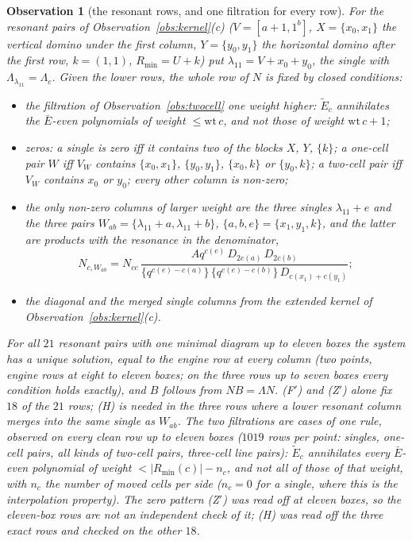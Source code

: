 \documentclass[11pt]{article}
\newtheorem{observation}{Observation}
\newcommand{\Lam}{\Lambda}
\newcommand{\Et}{\widetilde{E}}
\begin{document}
\begin{observation}[the resonant rows, and one filtration for every row]\label{obs:resrows}
For the resonant pairs of Observation~\ref{obs:kernel}(c) ($V=[a+1,1^b]$, $X=\{x_0,x_1\}$ the vertical domino under the
first column, $Y=\{y_0,y_1\}$ the horizontal domino after the first row, $k=(1,1)$, $R_{\min}=U+k$) put
$\lambda_{11}=V+x_0+y_0$, the single with $\Lam_{\lambda_{11}}=\Lam_c$.  Given the lower rows, the whole row of $N$ is fixed
by closed conditions:
\begin{itemize}
\item[(F$'$)] the filtration of Observation~\ref{obs:twocell} one weight higher: $\Et_c$ annihilates the $\bar E$-even
polynomials of weight $\le\mathrm{wt}\,c$, and not those of weight $\mathrm{wt}\,c+1$;
\item[(Z$'$)] zeros: a single is zero iff it contains two of the blocks $X$, $Y$, $\{k\}$; a one-cell pair $W$ iff $V_W$
contains $\{x_0,x_1\}$, $\{y_0,y_1\}$, $\{x_0,k\}$ or $\{y_0,k\}$; a two-cell pair iff $V_W$ contains $x_0$ or $y_0$;
every other column is non-zero;
\item[(H)] the only non-zero columns of larger weight are the three singles $\lambda_{11}+e$ and the three pairs
$W_{ab}=\{\lambda_{11}+a,\lambda_{11}+b\}$, $\{a,b,e\}=\{x_1,y_1,k\}$, and the latter are products with the resonance in
the denominator,
\[
N_{c,W_{ab}}=N_{cc}\,\frac{Aq^{c(e)}\,D_{2c(a)}\,D_{2c(b)}}{\{q^{c(e)-c(a)}\}\,\{q^{c(e)-c(b)}\}\,D_{c(x_1)+c(y_1)}};
\]
\item[(D), (K$'$)] the diagonal and the merged single columns from the extended kernel of Observation~\ref{obs:kernel}(c).
\end{itemize}
For all $21$ resonant pairs with one minimal diagram up to eleven boxes the system has a unique solution, equal to the
engine row at every column (two points, engine rows at eight to eleven boxes; on the three rows up to seven boxes every
condition holds exactly), and $B$ follows from $NB=\Lam N$.  (F$'$) and (Z$'$) alone fix $18$ of the $21$ rows; (H) is
needed in the three rows where a lower resonant column merges into the same single as $W_{ab}$.  The two filtrations are
cases of one rule, observed on every clean row up to eleven boxes ($1019$ rows per point: singles, one-cell pairs, all
kinds of two-cell pairs, three-cell line pairs): \emph{$\Et_c$ annihilates every $\bar E$-even polynomial of weight
$<|R_{\min}(c)|-n_c$, and not all of those of that weight}, with $n_c$ the number of moved cells per side ($n_c=0$ for a
single, where this is the interpolation property).  The zero pattern (Z$'$) was read off at eleven boxes, so the
eleven-box rows are not an independent check of it; (H) was read off the three exact rows and checked on the other $18$.


\end{observation}
\end{document}
